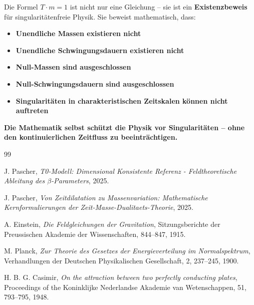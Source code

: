 Die Formel $T \cdot m = 1$ ist nicht nur eine Gleichung -- sie ist ein \textbf{Existenzbeweis} für singularitätenfreie Physik. Sie beweist mathematisch, dass:

\begin{itemize}
	\item \textbf{Unendliche Massen existieren nicht}
	\item \textbf{Unendliche Schwingungsdauern existieren nicht}
	\item \textbf{Null-Massen sind ausgeschlossen}
	\item \textbf{Null-Schwingungsdauern sind ausgeschlossen}
	\item \textbf{Singularitäten in charakteristischen Zeitskalen können nicht auftreten}
\end{itemize}

\textbf{Die Mathematik selbst schützt die Physik vor Singularitäten -- ohne den kontinuierlichen Zeitfluss zu beeinträchtigen.}	
	\begin{thebibliography}{99}

		J. Pascher, \textit{T0-Modell: Dimensional Konsistente Referenz - Feldtheoretische Ableitung des $\beta$-Parameters}, 2025.
		
		J. Pascher, \textit{Von Zeitdilatation zu Massenvariation: Mathematische Kernformulierungen der Zeit-Masse-Dualitaets-Theorie}, 2025.
		
		A. Einstein, \textit{Die Feldgleichungen der Gravitation}, Sitzungsberichte der Preussischen Akademie der Wissenschaften, 844--847, 1915.
		
		M. Planck, \textit{Zur Theorie des Gesetzes der Energieverteilung im Normalspektrum}, Verhandlungen der Deutschen Physikalischen Gesellschaft, 2, 237--245, 1900.
		
		H. B. G. Casimir, \textit{On the attraction between two perfectly conducting plates}, Proceedings of the Koninklijke Nederlandse Akademie van Wetenschappen, 51, 793--795, 1948.
	\end{thebibliography}
	